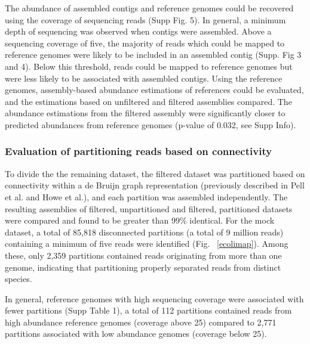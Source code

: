 \documentclass[11pt]{article} %
\begin{document}
The abundance of assembled contigs and reference genomes could be
recovered using the coverage of sequencing reads (Supp Fig. 5).  In
general, a minimum depth of sequencing was observed when contigs were
assembled. Above a sequencing coverage of five, the majority of reads
which could be mapped to reference genomes were likely to be included
in an assembled contig (Supp. Fig 3 and 4).  Below this threshold,
reads could be mapped to reference genomes but were less likely to be
associated with assembled contigs.  Using the reference genomes,
assembly-based abundance estimations of references could be evaluated,
and the estimations based on unfiltered and filtered assemblies
compared.  The abundance estimations from the filtered assembly were
significantly closer to predicted abundances from reference genomes
(p-value of 0.032, see Supp Info).

\subsubsection{Evaluation of partitioning reads based on connectivity}
To divide the the remaining dataset, the filtered dataset was
partitioned based on connectivity within a de Bruijn graph
representation (previously described in Pell et al. and Howe et al.),
and each partition was assembled independently.  The resulting
assemblies of filtered, unpartitioned and filtered, partitioned
datasets were compared and found to be greater than 99\% identical.
For the mock dataset, a total of 85,818 disconnected partitions (a
total of 9 million reads) containing a minimum of five reads were
identified (Fig. ~\ref{ecolimap}).  Among these, only 2,359 partitions
contained reads originating from more than one genome, indicating that
partitioning properly separated reads from distinct species.


In general, reference genomes with high sequencing coverage were
associated with fewer partitions (Supp Table 1), a
total of 112 partitions contained reads from high abundance reference
genomes (coverage above 25) compared to 2,771 partitions associated
with low abundance genomes (coverage below 25).

\end{document}

